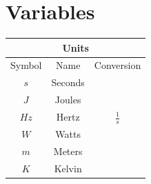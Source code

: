 \documentclass[10pt]{article}
\begin{document}
\section{Variables}
        \begin{table}
        \centering
            \begin{tabular}{|c|c|c|} \hline 
                \multicolumn{3}{|c|}{Units}\\ \hline 
                Symbol  &   Name    &   Conversion\\ \hline 
                $s$     &   Seconds &\\ \hline 
                $J$     &   Joules  &\\ \hline 
                $Hz$    &   Hertz   &   $\frac{1}{s}$\\ \hline 
                $W$     &   Watts   &\\ \hline 
                $m$     &   Meters  &\\ \hline 
                $K$     &   Kelvin  &\\ \hline
            \end{tabular}
        \label{tab:unit}
        \end{table} 
\end{document}
